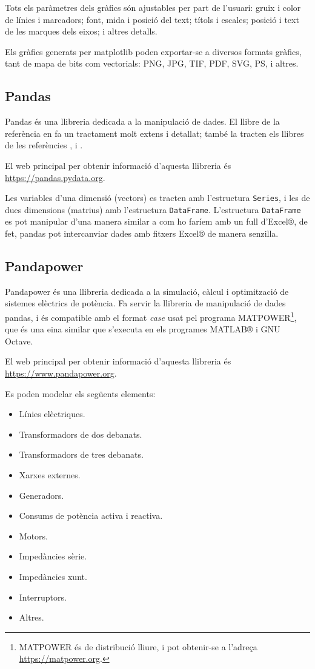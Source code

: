 Tots els paràmetres dels gràfics són ajustables per part de l'usuari: gruix i color de línies i marcadors; font, mida i posició  del text;  títols i escales; posició i text de les marques dels eixos; i altres detalls.

Els gràfics generats per matplotlib poden exportar-se a diversos formats gràfics, tant de mapa de bits com vectorials: PNG, JPG, TIF, PDF, SVG, PS, i altres.



\subsection{Pandas}

Pandas és una llibreria dedicada a la manipulació de dades.  El llibre de la referència \cite{VAN} en fa un tractament molt extens i detallat; també la tracten els llibres de les referències \cite{JOH}, \cite{HIL} i \cite{ZUM}.


El  web principal per obtenir informació d'aquesta llibreria és \href{https://pandas.pydata.org/}{https://pandas.pydata.org}.

Les variables d'una dimensió (vectors) es tracten amb l'estructura \texttt{Series}, i les de dues dimensions (matrius) amb l'estructura \texttt{DataFrame}. L'estructura \texttt{DataFrame} es pot manipular d'una manera similar a com ho faríem amb un full d'Excel®, de fet, pandas pot intercanviar dades amb fitxers Excel® de manera senzilla.


\subsection{Pandapower}

Pandapower és una llibreria dedicada a la simulació, càlcul i optimització de sistemes elèctrics de potència.  Fa servir la llibreria de manipulació de dades pandas, i és compatible amb el format \textit{case} usat pel programa MATPOWER\footnote{MATPOWER és de distribució lliure, i pot obtenir-se a l'adreça \href{https://matpower.org/}{https://matpower.org}.}, que és una eina similar que s'executa en els programes MATLAB® i GNU Octave.

El  web principal per obtenir informació d'aquesta llibreria és \href{https://www.pandapower.org/}{https://www.pandapower.org}.

Es poden modelar els següents elements:
\begin{itemize}
	\item Línies elèctriques.
	\item Transformadors de dos debanats.
	\item Transformadors de tres debanats.
	\item Xarxes externes.
	\item Generadors.
	\item Consums de potència activa i reactiva.
	\item Motors.
	\item Impedàncies sèrie.
	\item Impedàncies xunt.
	\item Interruptors.
	\item Altres.
\end{itemize}

